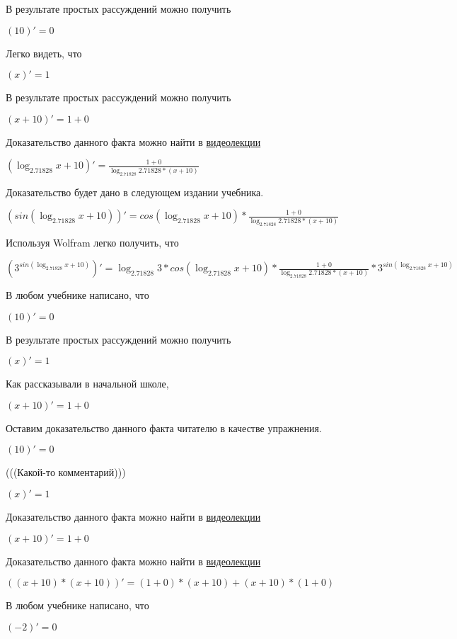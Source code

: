 \documentclass[12pt,a4paper,fleqn]{article}
\theoremstyle{definition}
\begin{document}
В результате простых рассуждений можно получить

$( 10 )' =  0 $

Легко видеть, что

$( x )' =  1 $

В результате простых рассуждений можно получить

$( x  +  10 )' =  1  +  0 $

Доказательство данного факта можно найти в \href{https://www.youtube.com/watch?v=dQw4w9WgXcQ}{видеолекции}

$(\log_{ 2.71828 }{ x  +  10 })' = \frac{ 1  +  0 }{\log_{ 2.71828 }{ 2.71828 } * ( x  +  10 )}
$

Доказательство будет дано в следующем издании учебника.

$(sin(\log_{ 2.71828 }{ x  +  10 }))' = cos(\log_{ 2.71828 }{ x  +  10 }) * \frac{ 1  +  0 }{\log_{ 2.71828 }{ 2.71828 } * ( x  +  10 )}
$

Используя Wolfram легко получить, что

$({ 3 }^{sin(\log_{ 2.71828 }{ x  +  10 })})' = \log_{ 2.71828 }{ 3 } * cos(\log_{ 2.71828 }{ x  +  10 }) * \frac{ 1  +  0 }{\log_{ 2.71828 }{ 2.71828 } * ( x  +  10 )}
 * { 3 }^{sin(\log_{ 2.71828 }{ x  +  10 })}$

В любом учебнике написано, что

$( 10 )' =  0 $

В результате простых рассуждений можно получить

$( x )' =  1 $

Как рассказывали в начальной школе,

$( x  +  10 )' =  1  +  0 $

Оставим доказательство данного факта читателю в качестве упражнения.

$( 10 )' =  0 $

(((Какой-то комментарий)))

$( x )' =  1 $

Доказательство данного факта можно найти в \href{https://www.youtube.com/watch?v=dQw4w9WgXcQ}{видеолекции}

$( x  +  10 )' =  1  +  0 $

Доказательство данного факта можно найти в \href{https://www.youtube.com/watch?v=dQw4w9WgXcQ}{видеолекции}

$(( x  +  10 ) * ( x  +  10 ))' = ( 1  +  0 ) * ( x  +  10 ) + ( x  +  10 ) * ( 1  +  0 )$

В любом учебнике написано, что

$( -2 )' =  0 $
\end{document}
